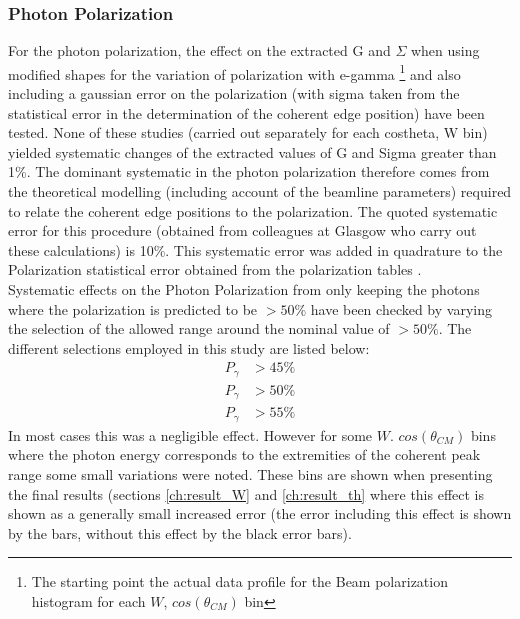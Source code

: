 \subsubsection{Photon Polarization}\label{sec:ph_pol_sys}
For the photon polarization, the effect on the extracted G and $\Sigma$ when using modified shapes for the variation of polarization with e-gamma \footnote{The starting point the actual  data profile for the Beam polarization histogram for each $W$, $cos(\theta_{CM})$ bin} and also including a gaussian error on the polarization (with sigma taken from the statistical error in the determination of the coherent edge position) have been tested. None of these studies (carried out separately for each costheta, W bin) yielded systematic changes of the extracted values of G and Sigma greater than 1\%. The dominant systematic in the photon polarization therefore comes from the theoretical modelling (including account of the beamline parameters) required to relate the coherent edge positions to the polarization. The quoted systematic error for this procedure (obtained from colleagues at Glasgow who carry out these calculations) is 10\%.
 This systematic error was added in quadrature to the Polarization statistical error obtained from the polarization tables \cite{Anderson_table}. \\
Systematic effects on the Photon Polarization from only keeping the photons where the polarization is predicted to be $>50\%$  have been checked by varying the selection of the allowed range around the nominal value of $>50\%$. The different selections employed in this study are listed below: 
\begin{align}
  P_\gamma &> 45 \% \\
  P_\gamma &> 50 \% \\
  P_\gamma &> 55 \% 
\end{align}
In most cases this was a negligible effect. However for some $W$. $cos(\theta_{CM})$ bins where the photon energy corresponds to the extremities of the coherent peak range some small variations were noted. These bins are shown when presenting the final results (sections \ref{ch:result_W} and \ref{ch:result_th} where this effect is shown as a generally small increased error (the error including this effect is shown by the \color{red}{red} \color{black}{error} bars, without this effect by the black error bars). 


